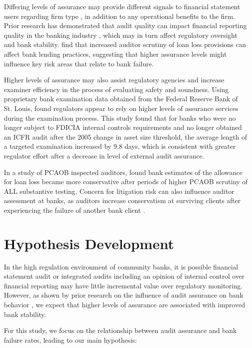 \documentclass[12pt]{article}
\begin{document}
Differing levels of assurance may provide different signals to financial statement users regarding firm type \citep{Dharan1992}, in addition to any operational benefits to the firm. Prior research has demonstrated that audit quality can impact financial reporting quality in the banking industry \citep{Beck2022}, which may in turn affect regulatory oversight and bank stability. \citet{Ege2025} find that increased auditor scrutiny of loan loss provisions can affect bank lending practices, suggesting that higher assurance levels might influence key risk areas that relate to bank failure.

Higher levels of assurance may also assist regulatory agencies and increase examiner efficiency in the process of evaluating safety and soundness. Using proprietary bank examination data obtained from the Federal Reserve Bank of St. Louis, \citet{Gopalan2024} found regulators appear to rely on higher levels of assurance services during the examination process. This study found that for banks who were no longer subject to FDICIA internal controls requirements and no longer obtained an ICFR audit after the 2005 change in asset size threshold, the average length of a targeted examination increased by 9.8 days, which is consistent with greater regulator effort after a decrease in level of external audit assurance.

In a study of PCAOB inspected auditors, \citet{StuberHogan2021} found bank estimates of the allowance for loan loss became more conservative after periods of higher PCAOB scrutiny of ALL substantive testing. Concern for litigation risk can also influence auditor assessment at banks, as auditors increase conservatism at surviving clients after experiencing the failure of another bank client \citep{Hall2023}.

\section{Hypothesis Development}

In the high regulation environment of community banks, it is possible financial statement audit or integrated audits including an opinion of internal control over financial reporting may have little incremental value over regulatory monitoring. However, as shown by prior research on the influence of audit assurance on bank behavior \citep{Jin2013a, Jin2013b, Gopalan2024}, we expect that higher levels of assurance are associated with improved bank stability.

For this study, we focus on the relationship between audit assurance and bank failure rates, leading to our main hypothesis:
\end{document}
